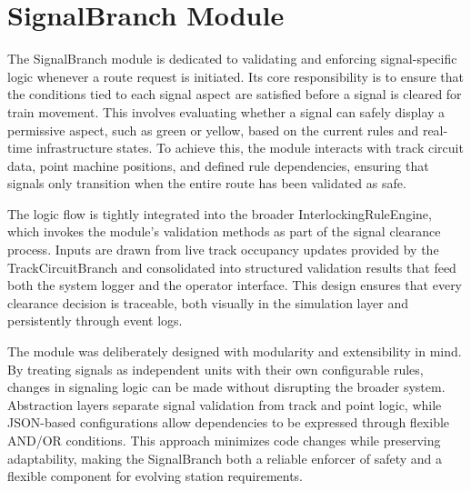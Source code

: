 \section{SignalBranch Module}
\label{sec:methodology:signal-branch}

The SignalBranch module is dedicated to validating and enforcing signal-specific logic whenever a route request is initiated. Its core responsibility is to ensure that the conditions tied to each signal aspect are satisfied before a signal is cleared for train movement. This involves evaluating whether a signal can safely display a permissive aspect, such as green or yellow, based on the current rules and real-time infrastructure states. To achieve this, the module interacts with track circuit data, point machine positions, and defined rule dependencies, ensuring that signals only transition when the entire route has been validated as safe.

The logic flow is tightly integrated into the broader InterlockingRuleEngine, which invokes the module’s validation methods as part of the signal clearance process. Inputs are drawn from live track occupancy updates provided by the TrackCircuitBranch and consolidated into structured validation results that feed both the system logger and the operator interface. This design ensures that every clearance decision is traceable, both visually in the simulation layer and persistently through event logs.

The module was deliberately designed with modularity and extensibility in mind. By treating signals as independent units with their own configurable rules, changes in signaling logic can be made without disrupting the broader system. Abstraction layers separate signal validation from track and point logic, while JSON-based configurations allow dependencies to be expressed through flexible AND/OR conditions. This approach minimizes code changes while preserving adaptability, making the SignalBranch both a reliable enforcer of safety and a flexible component for evolving station requirements.
